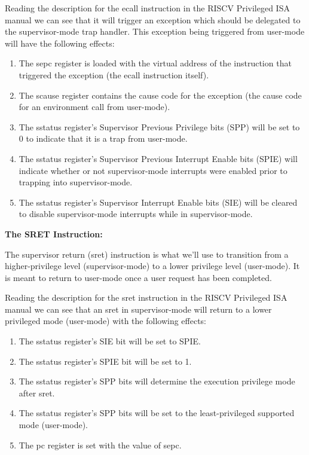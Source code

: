 \documentclass{article}
\begin{document}
    Reading the description for the {\fix ecall} instruction in the RISCV Privileged ISA manual we can see that it will trigger an exception 
    which should be delegated to the supervisor-mode trap handler. This exception being triggered from user-mode will have the following effects:
        \begin{enumerate}
            \item The {\fix sepc} register is loaded with the virtual address of the instruction that triggered the exception (\ie the {\fix ecall} instruction itself).
            \item The {\fix scause} register contains the cause code for the exception (the cause code for an environment call from user-mode).
            \item The {\fix sstatus} register's Supervisor Previous Privilege bits (SPP) will be set to 0 to indicate that it is a trap from user-mode.
            \item The {\fix sstatus} register's Supervisor Previous Interrupt Enable bits (SPIE) will indicate whether or not supervisor-mode interrupts
            were enabled prior to trapping into supervisor-mode. 
            \item The {\fix sstatus} register's Supervisor Interrupt Enable bits (SIE) will be cleared to disable supervisor-mode interrupts while in
            supervisor-mode.
        \end{enumerate}
    
        
     \textbf{The SRET Instruction:}

     The supervisor return ({\fix sret}) instruction is what we'll use to transition from a higher-privilege level (supervisor-mode) to a lower
     privilege level (user-mode). It is meant to return to user-mode once a user request has been completed.
     
     Reading the description for the {\fix sret} instruction in the RISCV Privileged ISA manual we can see that an {\fix sret} in supervisor-mode will 
     return to a lower privileged mode (user-mode) with the following effects:
        \begin{enumerate}
            \item The {\fix sstatus} register's SIE bit will be set to SPIE.
            \item The {\fix sstatus} register's SPIE bit will be set to 1.
            \item The {\fix sstatus} register's SPP bits will determine the execution privilege mode after {\fix sret}.
            \item The {\fix sstatus} register's SPP bits will be set to the least-privileged supported mode (user-mode).
            \item The {\fix pc} register is set with the value of {\fix sepc}.
        \end{enumerate}
     
\end{document}
